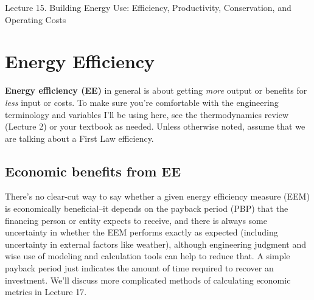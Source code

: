 \documentclass[10pt]{article}
\begin{document}
   \noindent
   \begin{center}

   \hrulefill
   
   \vspace{5pt}
   
   \vspace{0pt}
   
   {\Large \hfill  Lecture 15. Building Energy Use: Efficiency, Productivity, Conservation, and Operating Costs}
   \vspace{5pt}
   
  
   \hrulefill
   \end{center}


\section{Energy Efficiency}

\textbf{Energy efficiency (EE)} in general is about getting \textit{more} output or benefits for \textit{less} input or costs. To make sure you're comfortable with the engineering terminology and variables I'll be using here, see the thermodynamics review (Lecture 2) or your textbook as needed. Unless otherwise noted, assume that we are talking about a First Law efficiency.

\subsection{Economic benefits from EE}

There's no clear-cut way to say whether a given energy efficiency measure (EEM) is economically beneficial--it depends on the payback period (PBP)  that the financing person or entity expects to receive, and there is always some uncertainty in whether the EEM performs exactly as expected (including uncertainty in external factors like weather), although engineering judgment and wise use of modeling and calculation tools can help to reduce that. A simple payback period just indicates the amount of time required to recover an investment. We'll discuss more complicated methods of calculating economic metrics in Lecture 17.
\end{document}
